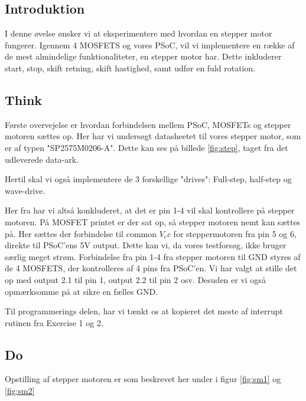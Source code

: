 \documentclass[../main.tex]{subfiles}
\begin{document}
\subsection{Introduktion}
I denne øvelse ønsker vi at eksperimentere med hvordan en stepper motor fungerer. Igennem 4 MOSFETS og vores PSoC, vil vi implementere en række af de mest almindelige funktionaliteter, en stepper motor har. Dette inkluderer start, stop, skift retning, skift hastighed, samt udfør en fuld rotation.

\subsection{Think}
Første overvejelse er hvordan forbindelsen mellem PSoC, MOSFETs og stepper motoren sættes op. Her har vi undersøgt datasheetet til vores stepper motor, som er af typen "SP2575M0206-A". Dette kan ses på billede \ref{fig:step}, taget fra det udleverede data-ark.


Hertil skal vi også implementere de 3 forskellige "drives": Full-step, half-step og wave-drive.

Her fra har vi altså konkluderet, at det er pin 1-4 vil skal kontrollere på stepper motoren. På MOSFET printet er der sat op, så stepper motoren nemt kan sættes på. Her sættes der forbindelse til common $V_cc$ for steppermotoren fra pin 5 og 6, direkte til PSoC'ens 5V output. Dette kan vi, da vores testforsøg, ikke bruger særlig meget strøm. Forbindelse fra pin 1-4 fra stepper motoren til GND styres af de 4 MOSFETS, der kontrolleres af 4 pins fra PSoC'en. Vi har valgt at stille det op med output 2.1 til pin 1, output 2.2 til pin 2 osv. Desuden er vi også opmærksomme på at sikre en fælles GND.

Til programmerings delen, har vi tænkt os at kopieret det meste af interrupt rutinen fra Exercise 1 og 2.

\subsection{Do}

Opstilling af stepper motoren er som beskrevet her under i figur \ref{fig:sm1} og \ref{fig:sm2}


\end{document}
